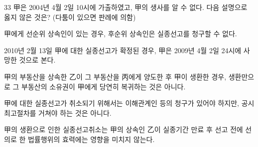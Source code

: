 \begin{question}{33}
甲은 2004년 4월 2일 10시에 가출하였고, 甲의 생사를 알 수 없다. 다음 설명으로 옳지 않은 것은? (다툼이 있으면 판례에 의함)
\begin{choices}
  \item 甲에게 선순위 상속인이 있는 경우, 후순위 상속인은 실종선고를 청구할 수 없다.
  \item 2010년 2월 13일 甲에 대한 실종선고가 확정된 경우, 甲은 2009년 4월 2일 24시에 사망한 것으로 본다.
  \item 甲의 부동산을 상속한 乙이 그 부동산을 丙에게 양도한 후 甲이 생환한 경우, 생환만으로 그 부동산의 소유권이 甲에게 당연히 복귀하는 것은 아니다.
  \item 甲에 대한 실종선고가 취소되기 위해서는 이해관계인 등의 청구가 있어야 하지만, 공시최고절차를 거쳐야 하는 것은 아니다.
  \item 甲의 생환으로 인한 실종선고취소는 甲의 상속인 乙이 실종기간 만료 후 선고 전에 선의로 한 법률행위의 효력에는 영향을 미치지 않는다.
\end{choices}
\end{question}
